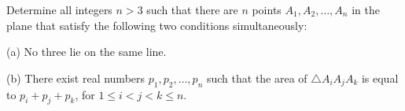 Determine all integers $n > 3$ such that there are $n$ points $A_1, A_2, \ldots, A_n$ in the plane that satisfy the following two conditions simultaneously:

(a) No three lie on the same line.

(b) There exist real numbers $p_1, p_2, \ldots, p_n$ such that the area of $\triangle A_i A_j A_k$ is equal to $p_i + p_j + p_k$, for $1 \leq i < j < k \leq n$.
